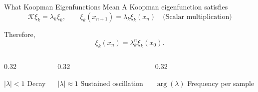 \documentclass[aspectratio=169,10pt]{beamer}
\newcommand{\Koop}{\mathcal{K}}
\begin{document}
\begin{frame}{What Koopman Eigenfunctions Mean}
    A Koopman eigenfunction satisfies
    \[
        \Koop \xi_k = \lambda_k \xi_k,
        \qquad
        \xi_k(x_{n+1}) = \lambda_k \xi_k(x_n) \quad \text{(Scalar multiplication)}
    \]

    \vspace{0.15cm}
    Therefore,
    \[
        \xi_k(x_n) = \lambda_k^n \xi_k(x_0).
    \]

    \vspace{0.2cm}
    \begin{columns}[T,onlytextwidth]
        \begin{column}{0.32\textwidth}
            \begin{block}{\(|\lambda| < 1\)}
                Decay
            \end{block}
        \end{column}
        \begin{column}{0.32\textwidth}
            \begin{block}{\(|\lambda| \approx 1\)}
                Sustained oscillation
            \end{block}
        \end{column}
        \begin{column}{0.32\textwidth}
            \begin{block}{\(\arg(\lambda)\)}
                Frequency per sample
            \end{block}
        \end{column}
    \end{columns}

\end{frame}
\end{document}
